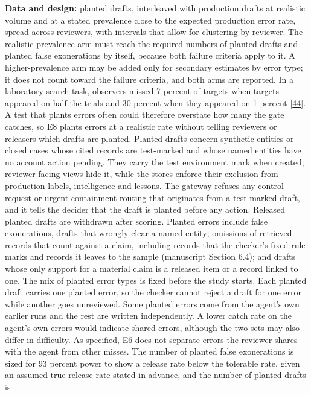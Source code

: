 \documentclass[
  11pt,
]{article}
\begin{document}
\textbf{Data and design:} planted drafts, interleaved with production
drafts at realistic volume and at a stated prevalence close to the
expected production error rate, spread across reviewers, with intervals
that allow for clustering by reviewer. The realistic-prevalence arm must
reach the required numbers of planted drafts and planted false
exonerations by itself, because both failure criteria apply to it. A
higher-prevalence arm may be added only for secondary estimates by error
type; it does not count toward the failure criteria, and both arms are
reported. In a laboratory search task, observers missed 7 percent of
targets when targets appeared on half the trials and 30 percent when
they appeared on 1 percent
{[}\protect\hyperlink{ref-Wolfe2005Rare}{44}{]}. A test that plants
errors often could therefore overstate how many the gate catches, so E8
plants errors at a realistic rate without telling reviewers or releasers
which drafts are planted. Planted drafts concern synthetic entities or
closed cases whose cited records are test-marked and whose named
entities have no account action pending. They carry the test environment
mark when created; reviewer-facing views hide it, while the stores
enforce their exclusion from production labels, intelligence and
lessons. The gateway refuses any control request or urgent-containment
routing that originates from a test-marked draft, and it tells the
decider that the draft is planted before any action. Released planted
drafts are withdrawn after scoring. Planted errors include false
exonerations, drafts that wrongly clear a named entity; omissions of
retrieved records that count against a claim, including records that the
checker's fixed rule marks and records it leaves to the sample
(manuscript Section 6.4); and drafts whose only support for a material
claim is a released item or a record linked to one. The mix of planted
error types is fixed before the study starts. Each planted draft carries
one planted error, so the checker cannot reject a draft for one error
while another goes unreviewed. Some planted errors come from the agent's
own earlier runs and the rest are written independently. A lower catch
rate on the agent's own errors would indicate shared errors, although
the two sets may also differ in difficulty. As specified, E6 does not
separate errors the reviewer shares with the agent from other misses.
The number of planted false exonerations is sized for 93 percent power
to show a release rate below the tolerable rate, given an assumed true
release rate stated in advance, and the number of planted drafts is
\end{document}
